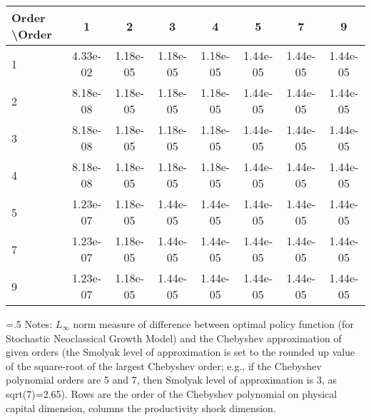\begin{tabular*}{1.00\textwidth}{@{\extracolsep{\fill}}l|ccccccc} 
 \hline \hline 
 Order \textbackslash Order & 1 & 2 & 3 & 4 & 5 & 7 & 9 \\ 
 \hline 
1 & 4.33e-02 & 1.18e-05 & 1.18e-05 & 1.18e-05 & 1.44e-05 & 1.44e-05 & 1.44e-05 \\ 
 2 & 8.18e-08 & 1.18e-05 & 1.18e-05 & 1.18e-05 & 1.44e-05 & 1.44e-05 & 1.44e-05 \\ 
 3 & 8.18e-08 & 1.18e-05 & 1.18e-05 & 1.18e-05 & 1.44e-05 & 1.44e-05 & 1.44e-05 \\ 
 4 & 8.18e-08 & 1.18e-05 & 1.18e-05 & 1.18e-05 & 1.44e-05 & 1.44e-05 & 1.44e-05 \\ 
 5 & 1.23e-07 & 1.18e-05 & 1.44e-05 & 1.44e-05 & 1.44e-05 & 1.44e-05 & 1.44e-05 \\ 
 7 & 1.23e-07 & 1.18e-05 & 1.44e-05 & 1.44e-05 & 1.44e-05 & 1.44e-05 & 1.44e-05 \\ 
 9 & 1.23e-07 & 1.18e-05 & 1.44e-05 & 1.44e-05 & 1.44e-05 & 1.44e-05 & 1.44e-05 \\ 
 \hline 
 \end{tabular*} 
\begin{minipage}[t]{1.00\textwidth}{\baselineskip=.5\baselineskip \vspace{.3cm} \footnotesize{ 
Notes: $L_{\infty}$ norm measure of difference between optimal policy function (for Stochastic Neoclassical Growth Model) and the Chebyshev approximation of given orders  (the Smolyak level of approximation is set to the rounded up value of the square-root of the largest Chebyshev order; e.g., if the Chebyshev polynomial orders are 5 and 7, then Smolyak level of approximation is 3, as sqrt(7)=2.65). Rows are the order of the Chebyshev polynomial on physical capital dimension, columns the productivity shock dimension. \\ 
}} \end{minipage}